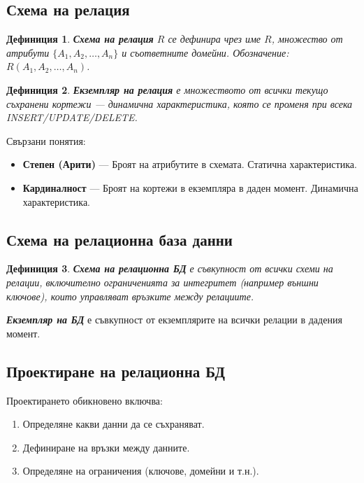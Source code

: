 \documentclass{scrartcl}
\newtheorem{definition}{Дефиниция}
\begin{document}
\begin{FlushLeft}
\subsection{Схема на релация}

\begin{definition}
\textbf{\textit{Схема на релация}} $R$ се дефинира чрез име $R$, множество от атрибути $\{A_1, A_2, \ldots, A_n\}$ и съответните домейни. Обозначение: $R(A_1, A_2, \ldots, A_n)$.
\end{definition}

\begin{definition}
\textbf{\textit{Екземпляр на релация}} е множеството от всички текущо съхранени кортежи — динамична характеристика, която се променя при всека INSERT/UPDATE/DELETE.
\end{definition}

Свързани понятия:

\begin{itemize}
    \item \textbf{Степен (Арити)} --- Броят на атрибутите в схемата. Статична характеристика.
    \item \textbf{Кардиналност} --- Броят на кортежи в екземпляра в даден момент. Динамична характеристика.
\end{itemize}

\subsection{Схема на релационна база данни}

\begin{definition}
\textbf{\textit{Схема на релационна БД}} е съвкупност от всички схеми на релации, включително ограниченията за интегритет (например външни ключове), които управляват връзките между релациите.
\end{definition}

\textbf{\textit{Екземпляр на БД}} е съвкупност от екземплярите на всички релации в дадения момент.

\subsection{Проектиране на релационна БД}

Проектирането обикновено включва:

\begin{enumerate}
    \item Определяне какви данни да се съхраняват.
    \item Дефиниране на връзки между данните.
    \item Определяне на ограничения (ключове, домейни и т.н.).
\end{enumerate}


\end{FlushLeft}
\end{document}
